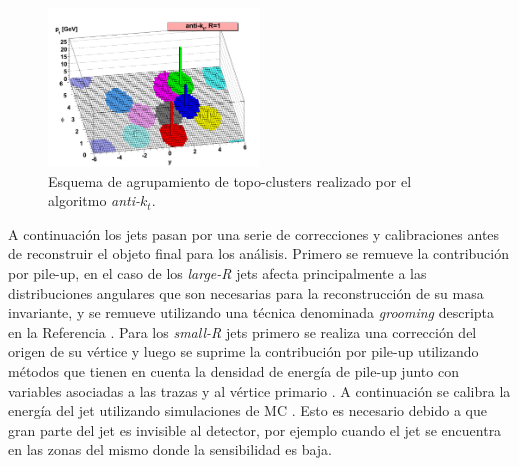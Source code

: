 \begin{figure}
\centering
  \includegraphics[width=0.5\textwidth]{images/antikt.png}
\caption{Esquema de agrupamiento de topo-clusters realizado por el algoritmo \textit{anti-$k_t$}. 
 \commentNotaIII
 }
  \label{antikt}
\end{figure}

A continuación los jets pasan por una serie de correcciones y calibraciones antes de reconstruir el objeto final para los análisis. Primero se remueve la contribución por pile-up, en el caso de los \textit{large-R} jets afecta principalmente a las distribuciones angulares que son necesarias para la reconstrucción de su masa invariante, y se remueve utilizando una técnica denominada \textit{grooming} descripta en la Referencia \cite{trimming}. Para los \textit{small-R} jets primero se realiza una corrección del origen de su vértice y luego se suprime la contribución por pile-up utilizando métodos que tienen en cuenta la densidad de energía de pile-up \cite{PERF-2016-04} junto con variables asociadas a las trazas y al vértice primario \cite{PERF-2014-03}
. 
A continuación se calibra la energía del jet utilizando simulaciones de MC
. Esto es necesario debido a que gran parte del jet es invisible al detector, por ejemplo cuando el jet se encuentra en las zonas del mismo donde la sensibilidad es baja. 
